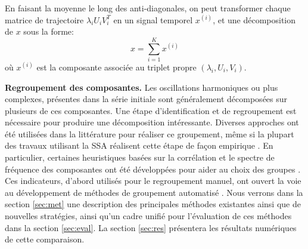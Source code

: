 \documentclass{gretsi}
\def\HH{\mathcal H}
\begin{document}
En faisant la moyenne le long des anti-diagonales, on peut transformer chaque matrice de trajectoire $\lambda_iU_iV_i^T$  en un signal temporel $x^{(i)}$, et une décomposition de $x$ sous la forme:
\vspace{-.15cm}
\begin{equation}
    x = \sum_{i=1}^K x^{(i)}
\end{equation}
où $x^{(i)} $ est la composante associée au triplet propre $(\lambda_i, U_i, V_i)$.




\begin{sloppypar}
\noindent\textbf{Regroupement des composantes.}\label{sub:grp}
Les oscillations harmoniques ou plus complexes, présentes dans la série initiale sont généralement décomposées sur plusieurs de ces composantes.
Une étape d'identification et de regroupement est nécessaire pour produire une décomposition intéressante.
Diverses approches ont été utilisées dans la littérature pour réaliser ce groupement, même si la plupart des travaux utilisant la SSA réalisent cette étape de façon empirique \cite{Ghil_02_SSA, Golyandina_10_ssa}.
En particulier, certaines heuristiques basées sur la corrélation et le spectre de fréquence des composantes ont été développées pour aider au choix des groupes \cite{Golyandina_10_ssa}.
Ces indicateurs, d'abord utilisés pour le regroupement manuel, ont ouvert la voie au développement de méthodes de groupement automatisé \cite{abalov_14_auto, alvarez_13_auto, alexandrov_05_auto}.
Nous verrons dans la section \ref{sec:met} une description des principales méthodes existantes ainsi que de nouvelles stratégies, ainsi qu'un cadre unifié pour l'évaluation de ces méthodes dans la section \ref{sec:eval}.
La section \ref{sec:res} présentera les résultats numériques de cette comparaison.
\end{sloppypar}
\end{document}
